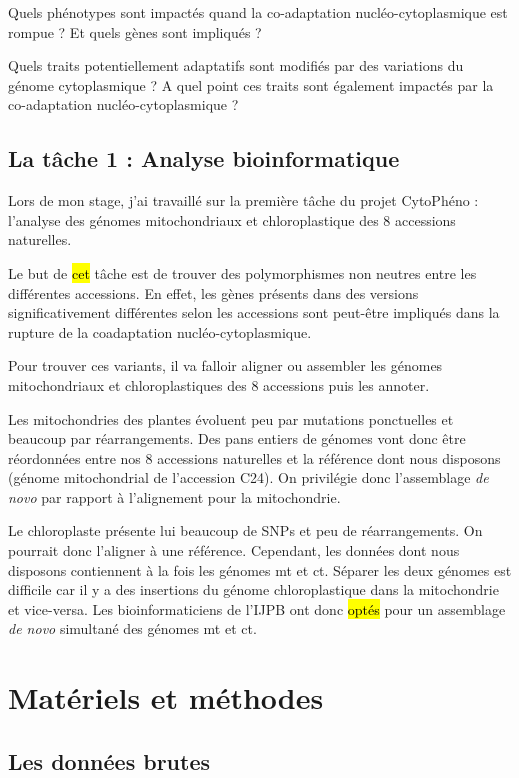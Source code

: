 \documentclass[a4paper]{article}
\newcommand{\rewrite}[1]{\todo[color=green!40]{#1}}
\newcommand{\hlrewrite}[2]{\sethlcolor{green} \hl{#1} \rewrite{#2}}
\begin{document}
Quels phénotypes sont impactés quand la co-adaptation nucléo-cytoplasmique est rompue ? Et quels gènes sont impliqués ?

Quels traits potentiellement adaptatifs sont modifiés par des variations du génome cytoplasmique ? A quel point ces traits sont également impactés par la co-adaptation nucléo-cytoplasmique ?  

\subsection{La tâche 1 : Analyse bioinformatique}

Lors de mon stage, j'ai travaillé sur la première tâche du projet CytoPhéno : l'analyse des génomes mitochondriaux et chloroplastique des 8 accessions naturelles.

Le but de \hlrewrite{cet}{cette} tâche est de trouver des polymorphismes non neutres entre les différentes accessions. En effet, les gènes présents dans des versions significativement différentes selon les accessions sont peut-être impliqués dans la rupture de la coadaptation nucléo-cytoplasmique. 

Pour trouver ces variants, il va falloir aligner ou assembler les génomes mitochondriaux et chloroplastiques des 8 accessions puis les annoter. 

Les mitochondries des plantes évoluent peu par mutations ponctuelles et beaucoup par réarrangements. Des pans entiers de génomes vont donc être réordonnées entre nos 8 accessions naturelles et la référence dont nous disposons (génome mitochondrial de l'accession C24). On privilégie donc l'assemblage \textit{de novo} par rapport à l'alignement pour la mitochondrie.

Le chloroplaste présente lui beaucoup de SNPs et peu de réarrangements. On pourrait donc l'aligner à une référence. Cependant, les données dont nous disposons contiennent à la fois les génomes mt et ct. Séparer les deux génomes est difficile car il y a des insertions du génome chloroplastique dans la mitochondrie et vice-versa. Les bioinformaticiens de l'IJPB ont donc \hlrewrite{optés}{opté} pour un assemblage \textit{de novo} simultané des génomes mt et ct.


\section{Matériels et méthodes}

\subsection{Les données brutes}
\end{document}
